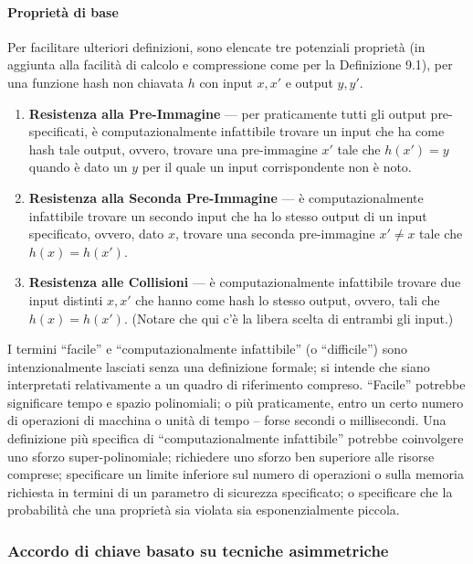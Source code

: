 \documentclass{article}
\theoremstyle{definition}
\begin{document}
\paragraph{Proprietà di base}
Per facilitare ulteriori definizioni, sono elencate tre potenziali proprietà (in aggiunta alla facilità di calcolo e compressione come per la Definizione 9.1), per una funzione hash non chiavata \( h \) con input \( x, x' \) e output \( y, y' \).

\begin{enumerate}
    \item \textbf{Resistenza alla Pre-Immagine} --- per praticamente tutti gli output pre-specificati, è computazionalmente infattibile trovare un input che ha come hash tale output, ovvero, trovare una pre-immagine \( x' \) tale che \( h(x') = y \) quando è dato un \( y \) per il quale un input corrispondente non è noto.
    \item \textbf{Resistenza alla Seconda Pre-Immagine} --- è computazionalmente infattibile trovare un secondo input che ha lo stesso output di un input specificato, ovvero, dato \( x \), trovare una seconda pre-immagine \( x' \neq x \) tale che \( h(x) = h(x') \).
    \item \textbf{Resistenza alle Collisioni} --- è computazionalmente infattibile trovare due input distinti \( x, x' \) che hanno come hash lo stesso output, ovvero, tali che \( h(x) = h(x') \). (Notare che qui c'è la libera scelta di entrambi gli input.)
\end{enumerate}

I termini ``facile'' e ``computazionalmente infattibile'' (o ``difficile'') sono intenzionalmente lasciati senza una definizione formale; si intende che siano interpretati relativamente a un quadro di riferimento compreso. ``Facile'' potrebbe significare tempo e spazio polinomiali; o più praticamente, entro un certo numero di operazioni di macchina o unità di tempo – forse secondi o millisecondi. Una definizione più specifica di ``computazionalmente infattibile'' potrebbe coinvolgere uno sforzo super-polinomiale; richiedere uno sforzo ben superiore alle risorse comprese; specificare un limite inferiore sul numero di operazioni o sulla memoria richiesta in termini di un parametro di sicurezza specificato; o specificare che la probabilità che una proprietà sia violata sia esponenzialmente piccola.

\subsubsection{Accordo di chiave basato su tecniche asimmetriche}%
\end{document}
